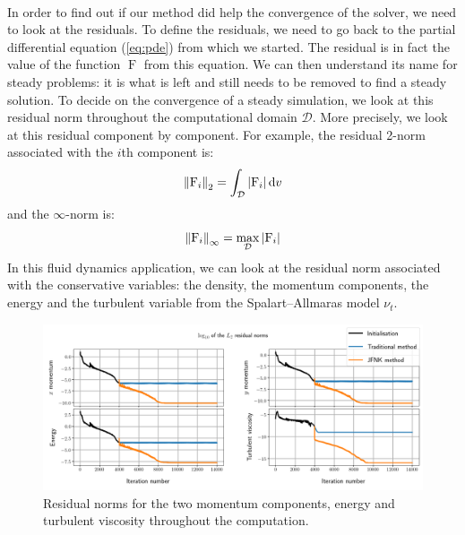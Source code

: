         \paragraph{}
        In order to find out if our method did help the convergence of the solver, we need to look at the residuals.
        To define the residuals, we need to go back to the partial differential equation (\ref{eq:pde}) from which we started.
        The residual is in fact the value of the function $\operatorname{F}$ from this equation.
        We can then understand its name for steady problems: it is what is left and still needs to be removed to find a steady solution.
        To decide on the convergence of a steady simulation, we look at this residual norm throughout the computational domain $\mathcal{D}$.
        More precisely, we look at this residual component by component.
        For example, the residual 2-norm associated with the $i$th component is:
        \begin{equation}
          \norm[2]{\operatorname{F}_i} = \int_\mathcal{D} \left| \operatorname{F}_i \right| \mathrm{d}v
        \end{equation}
        and the $\infty$-norm is:
        \begin{equation}
          \norm[\infty]{\operatorname{F}_i} = \max_\mathcal{D} \left| \operatorname{F}_i \right|
        \end{equation}
        In this fluid dynamics application, we can look at the residual norm associated with the conservative variables: the density, the momentum components, the energy and the turbulent variable from the Spalart--Allmaras model $\nu_t$.

        \begin{figure}
          \centering
          \includegraphics[width=\textwidth]{figures/rae_residuals.png}
          \caption{Residual norms for the two momentum components, energy and turbulent viscosity throughout the computation.}
          \label{fig:rae_residuals}
        \end{figure}

